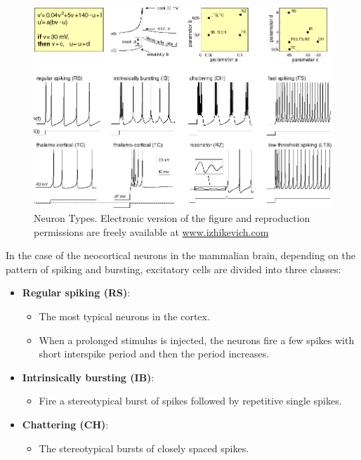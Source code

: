 \documentclass{article} %
\begin{document}
\begin{figure}[ht]
    \centering
    \includegraphics[width=\linewidth]{types.png}
    \caption{Neuron Types. Electronic version of the figure and reproduction permissions are freely available at \url{www.izhikevich.com}}
    \label{fig:types}
\end{figure}

In the case of the neocortical neurons in the mammalian brain, depending on the pattern of spiking and bursting, excitatory cells are divided into three classes:

\begin{itemize}
    \item \textbf{Regular spiking (RS)}:
    \begin{itemize}
        \item The most typical neurons in the cortex.
        \item When a prolonged stimulus is injected, the neurons fire a few spikes with short interspike period and then the period increases.
    \end{itemize}
    
    \item \textbf{Intrinsically bursting (IB)}:
    \begin{itemize}
        \item Fire a stereotypical burst of spikes followed by repetitive single spikes.
    \end{itemize}
    
    \item \textbf{Chattering (CH)}:
    \begin{itemize}
        \item The stereotypical bursts of closely spaced spikes.
    \end{itemize}
    
\end{itemize}
\end{document}
